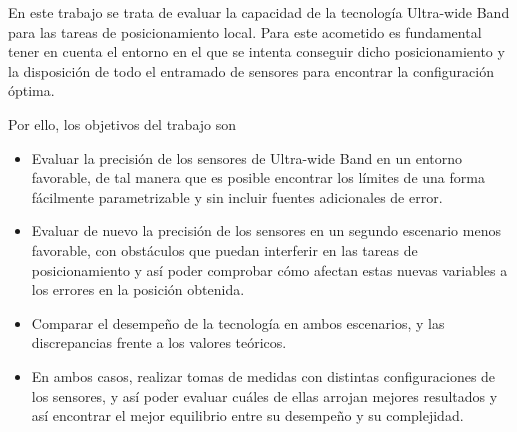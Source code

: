 En este trabajo se trata de evaluar la capacidad de la tecnología Ultra-wide Band para las tareas de posicionamiento local.
Para este acometido es fundamental tener en cuenta el entorno en el que se intenta conseguir dicho posicionamiento y la disposición de todo el entramado de sensores para encontrar la configuración óptima.

Por ello, los objetivos del trabajo son
\begin{itemize}
    \item Evaluar la precisión de los sensores de Ultra-wide Band en un entorno favorable, de tal manera que es posible encontrar los límites de una forma fácilmente parametrizable y sin incluir fuentes adicionales de error.
    \item Evaluar de nuevo la precisión de los sensores en un segundo escenario menos favorable, con obstáculos que puedan interferir en las tareas de posicionamiento y así poder comprobar cómo afectan estas nuevas variables a los errores en la posición obtenida.
    \item Comparar el desempeño de la tecnología en ambos escenarios, y las discrepancias frente a los valores teóricos.
    \item En ambos casos, realizar tomas de medidas con distintas configuraciones de los sensores, y así poder evaluar cuáles de ellas arrojan mejores resultados y así encontrar el mejor equilibrio entre su desempeño y su complejidad.
\end{itemize}